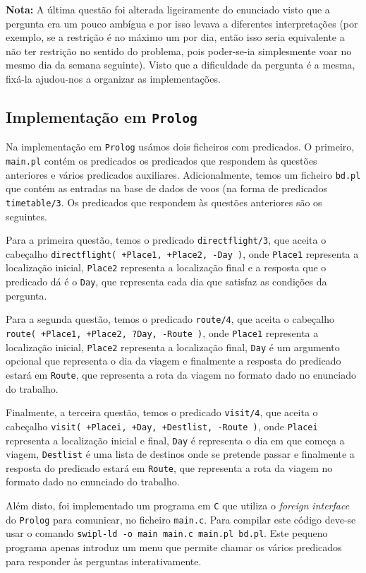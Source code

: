 \documentclass[12pt,a4paper,oneside]{article}
\begin{document}
\textbf{Nota:} A última questão foi alterada ligeiramente do enunciado
visto que a pergunta era um pouco ambígua e por isso levava a
diferentes interpretações (por exemplo, se a restrição é no máximo um
por dia, então isso seria equivalente a não ter restrição no sentido
do problema, pois poder-se-ia simplesmente voar no mesmo dia da semana
seguinte). Visto que a dificuldade da pergunta é a mesma, fixá-la
ajudou-nos a organizar as implementações.

\subsection{Implementação em \texttt{Prolog}}

Na implementação em \texttt{Prolog} usámos dois ficheiros com
predicados. O primeiro, \texttt{main.pl} contém os predicados os
predicados que respondem às questões anteriores e vários predicados
auxiliares. Adicionalmente, temos um ficheiro \texttt{bd.pl} que
contém as entradas na base de dados de voos (na forma de predicados
\texttt{timetable/3}. Os predicados que respondem às questões
anteriores são os seguintes.

Para a primeira questão, temos o predicado \texttt{directflight/3}, que
aceita o cabeçalho \texttt{directflight( +Place1, +Place2, -Day )}, onde
\texttt{Place1} representa a localização inicial, \texttt{Place2}
representa a localização final e a resposta que o predicado dá é o
\texttt{Day}, que representa cada dia que satisfaz as condições da
pergunta.

Para a segunda questão, temos o predicado \texttt{route/4}, que aceita
o cabeçalho \texttt{route( +Place1, +Place2, ?Day, -Route )}, onde
\texttt{Place1} representa a localização inicial, \texttt{Place2}
representa a localização final, \texttt{Day} é um argumento opcional
que representa o dia da viagem e finalmente a resposta do predicado
estará em \texttt{Route}, que representa a rota da viagem no formato
dado no enunciado do trabalho.

Finalmente, a terceira questão, temos o predicado \texttt{visit/4},
que aceita o cabeçalho \texttt{visit( +Placei, +Day, +Destlist, -Route
  )}, onde \texttt{Placei} representa a localização inicial e final,
\texttt{Day} é representa o dia em que começa a viagem,
\texttt{Destlist} é uma lista de destinos onde se pretende passar e
finalmente a resposta do predicado estará em \texttt{Route}, que
representa a rota da viagem no formato dado no enunciado do trabalho.

Além disto, foi implementado um programa em \texttt{C} que utiliza o
\textit{foreign interface} do \texttt{Prolog} \cite{swi:2015} para
comunicar, no ficheiro \texttt{main.c}. Para compilar este código
deve-se usar o comando \texttt{swipl-ld -o main main.c main.pl
  bd.pl}. Este pequeno programa apenas introduz um menu que permite
chamar os vários predicados para responder às perguntas
interativamente.
\end{document}
